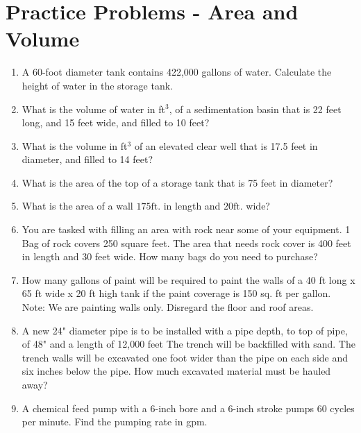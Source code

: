 \section*{Practice Problems - Area and Volume}
\begin{enumerate}

\item A 60-foot diameter tank contains 422,000 gallons of water. Calculate the height of water in the storage tank.

\item What is the volume of water in ft$^3$, of a sedimentation basin that is 22 feet long, and 15 feet wide, and filled to 10 feet?

\item What is the volume in ft$^3$ of an elevated clear well that is 17.5 feet in diameter, and filled to 14 feet?

\item What is the area of the top of a storage tank that is 75 feet in diameter?\\

\item  What is the area of a wall $175 \mathrm{ft}$. in length and $20 \mathrm{ft}$. wide?\\

\item  You are tasked with filling an area with rock near some of your equipment. 1 Bag of rock covers 250 square feet. The area that needs rock cover is 400 feet in length and 30 feet wide. How many bags do you need to purchase?\\

\item How many gallons of paint will be required to paint the walls of a 40 ft long x 65 ft wide x 20 ft high tank if the paint coverage is 150 sq. ft per gallon.  Note:  We are painting walls only.  Disregard the floor and roof areas.\\

\item A new 24" diameter pipe is to be installed with a pipe depth, to top of pipe, of 48" and a length of 12,000 feet The trench will be backfilled with sand. The trench walls will be excavated one foot wider than the pipe on each side and six inches below the pipe.  How much excavated material must be hauled away?

\item A chemical feed pump with a 6-inch bore and a 6-inch stroke pumps 60 cycles per minute. Find the pumping rate in gpm.
  

\end{enumerate}
\vspace{1cm}
